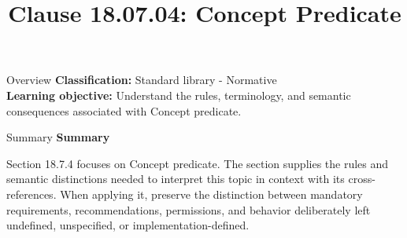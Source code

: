 \documentclass[10pt,letterpaper]{article}
\title{Clause 18.07.04: Concept Predicate}
\author{}
\date{}
\begin{document}
\maketitle
\begin{CornellOverviewBox}{Overview}
\textbf{Classification:} Standard library - Normative\\[2pt]
\textbf{Learning objective:} Understand the rules, terminology, and semantic consequences associated with Concept predicate.
\end{CornellOverviewBox}\begin{CornellSummaryBox}{Summary}
{\sffamily\bfseries\color{Accent} Summary}\par\vspace{3pt}Section 18.7.4 focuses on Concept predicate. The section supplies the rules and semantic distinctions needed to interpret this topic in context with its cross-references. When applying it, preserve the distinction between mandatory requirements, recommendations, permissions, and behavior deliberately left undefined, unspecified, or implementation-defined.
\end{CornellSummaryBox}
\end{document}
